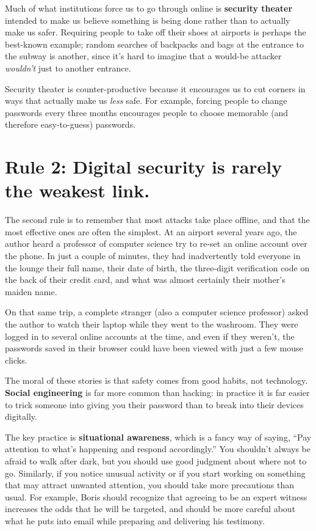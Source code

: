 \documentclass[10pt,letterpaper]{article}
\newcommand{\rulemajor}[1]{\section*{#1}}
\begin{document}
Much of what institutions force us to go through online is \textbf{security theater}
intended to make us believe something is being done
rather than to actually make us safer.
Requiring people to take off their shoes at airports is perhaps the best-known example;
random searches of backpacks and bags at the entrance to the subway is another,
since it's hard to imagine that a would-be attacker \emph{wouldn't} just to another entrance.

Security theater is counter-productive because it encourages us to cut corners
in ways that actually make us \emph{less} safe.
For example,
forcing people to change passwords every three months
encourages people to choose memorable (and therefore easy-to-guess) passwords.

\rulemajor{Rule 2: Digital security is rarely the weakest link.}

The second rule is to remember that most attacks take place offline,
and that the most effective ones are often the simplest.
At an airport several years ago,
the author heard a professor of computer science try to re-set an online account over the phone.
In just a couple of minutes,
they had inadvertently told everyone in the lounge their full name,
their date of birth,
the three-digit verification code on the back of their credit card,
and what was almost certainly their mother's maiden name.

On that same trip,
a complete stranger (also a computer science professor)
asked the author to watch their laptop while they went to the washroom.
They were logged in to several online accounts at the time,
and even if they weren't,
the passwords saved in their browser could have been viewed with just a few mouse clicks.

The moral of these stories is that safety comes from good habits,
not technology.
\textbf{Social engineering} is far more common than hacking:
in practice it is far easier to trick someone into giving you their password
than to break into their devices digitally.

The key practice is \textbf{situational awareness},
which is a fancy way of saying,
``Pay attention to what's happening and respond accordingly.''
You shouldn't always be afraid to walk after dark,
but you should use good judgment about where not to go.
Similarly,
if you notice unusual activity or if you start working on something that may attract unwanted attention,
you should take more precautions than usual.
For example,
Boris should recognize that agreeing to be an expert witness
increases the odds that he will be targeted,
and should be more careful about what he puts into email while preparing and delivering his testimony.
\end{document}
